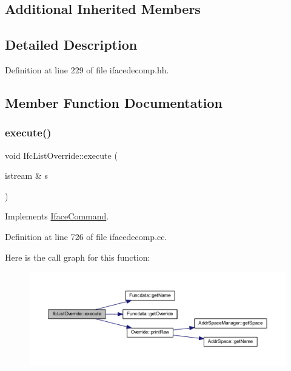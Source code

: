 \subsection*{Additional Inherited Members}


\subsection{Detailed Description}


Definition at line 229 of file ifacedecomp.\+hh.



\subsection{Member Function Documentation}
\mbox{\label{class_ifc_list_override_a85d2e02d525c2a7ab57e54602078a2b9}} 
\subsubsection{\texorpdfstring{execute()}{execute()}}
{\footnotesize\ttfamily void Ifc\+List\+Override\+::execute (\begin{DoxyParamCaption}\item[{istream \&}]{s }\end{DoxyParamCaption})\hspace{0.3cm}{\ttfamily [virtual]}}



Implements \mbox{\hyperlink{class_iface_command_af10e29cee2c8e419de6efe9e680ad201}{Iface\+Command}}.



Definition at line 726 of file ifacedecomp.\+cc.

Here is the call graph for this function\+:
\nopagebreak
\begin{figure}[H]
\begin{center}
\leavevmode
\includegraphics[width=350pt]{class_ifc_list_override_a85d2e02d525c2a7ab57e54602078a2b9_cgraph}
\end{center}
\end{figure}


